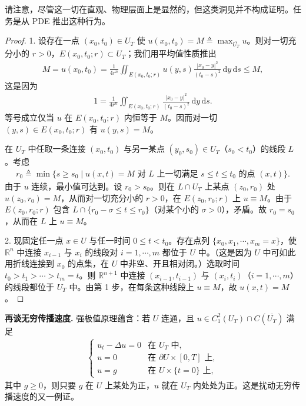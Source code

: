\documentclass[../../main.tex]{subfiles}
\begin{document}
请注意，尽管这一切在直观、物理层面上是显然的，但这类洞见并不构成证明。任务是从 PDE 推出这种行为。

\begin{proof}
1. 设存在一点 $(x_0,t_0)\in U_T$ 使 $u(x_0,t_0)=M\triangleq\max_{\overline{U_T}}u$。则对一切充分小的 $r>0$，$E(x_0,t_0;r)\subset U_T$；我们用平均值性质推出
\begin{align*}
M=u(x_0,t_0)=\frac{1}{4r^n}\iint_{E(x_0,t_0;r)}u(y,s)\frac{|x_0-y|^2}{(t_0-s)^2}\,\mathrm{d}y\,\mathrm{d}s\leqslant M,
\end{align*}
这是因为
\begin{align*}
1=\frac{1}{4r^n}\iint_{E(x_0,t_0;r)}\frac{|x_0-y|^2}{(t_0-s)^2}\,\mathrm{d}y\,\mathrm{d}s.
\end{align*}
等号成立仅当 $u$ 在 $E(x_0,t_0;r)$ 内恒等于 $M$。因而对一切 $(y,s)\in E(x_0,t_0;r)$ 有 $u(y,s)=M$。

在 $U_T$ 中任取一条连接 $(x_0,t_0)$ 与另一某点 $(y_0,s_0)\in U_T$（$s_0<t_0$）的线段 $L$。考虑
\begin{align*}
r_0\triangleq\min\{s\geqslant s_0\mid u(x,t)=M\text{ 对 }L\text{ 上一切满足 }s\leqslant t\leqslant t_0\text{ 的点 }(x,t)\}.
\end{align*}
由于 $u$ 连续，最小值可达到。设 $r_0>s_0$。则在 $L\cap U_T$ 上某点 $(z_0,r_0)$ 处 $u(z_0,r_0)=M$，从而对一切充分小的 $r>0$，在 $E(z_0,r_0;r)$ 上 $u\equiv M$。由于 $E(z_0,r_0;r)$ 包含 $L\cap\{r_0-\sigma\leqslant t\leqslant r_0\}$（对某个小的 $\sigma>0$），矛盾。故 $r_0=s_0$，从而在 $L$ 上 $u\equiv M$。

2. 现固定任一点 $x\in U$ 与任一时间 $0\leqslant t<t_0$。存在点列 $\{x_0,x_1,\cdots,x_m=x\}$，使 $\mathbb{R}^n$ 中连接 $x_{i-1}$ 与 $x_i$ 的线段对 $i=1,\cdots,m$ 都位于 $U$ 中。（这是因为 $U$ 中可如此用折线连接到 $x_0$ 的点集，在 $U$ 中非空、开且相对闭。）选取时间 $t_0>t_1>\cdots>t_m=t$。则 $\mathbb{R}^{n+1}$ 中连接 $(x_{i-1},t_{i-1})$ 与 $(x_i,t_i)$（$i=1,\cdots,m$）的线段都位于 $U_T$ 中。由第 1 步，在每条这种线段上 $u\equiv M$，故 $u(x,t)=M$。
\end{proof}

\textbf{再谈无穷传播速度.} 强极值原理蕴含：若 $U$ 连通，且 $u\in C^2_1(U_T)\cap C(\overline{U_T})$ 满足
\begin{align*}
\begin{cases}
u_t-\Delta u=0 & \text{在 }U_T\text{ 中},\\
u=0 & \text{在 }\partial U\times[0,T]\text{ 上},\\
u=g & \text{在 }U\times\{t=0\}\text{ 上},
\end{cases}
\end{align*}
其中 $g\geqslant 0$，则只要 $g$ 在 $U$ 上某处为正，$u$ 就在 $U_T$ 内处处为正。这是扰动无穷传播速度的又一例证。
\end{document}
